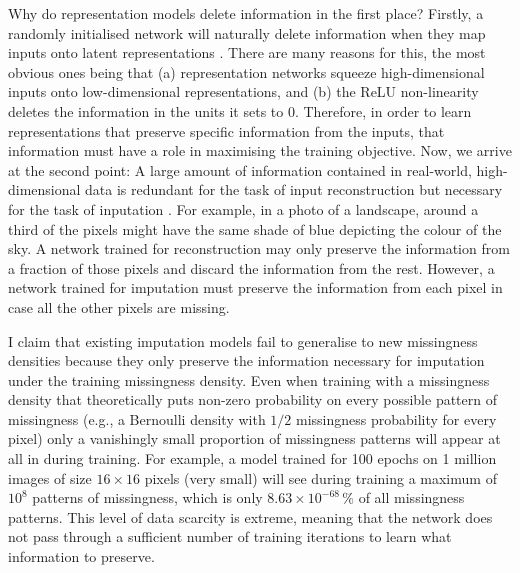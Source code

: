 \documentclass[../thesis.tex]{subfiles}
\begin{document}
Why do representation models delete information in the first place? Firstly, a randomly initialised network will naturally delete information when they map inputs onto latent representations \citep{lempitskyDeepImagePrior2018}. There are many reasons for this, the most obvious ones being that (a) representation networks squeeze high-dimensional inputs onto low-dimensional representations, and (b) the ReLU non-linearity deletes the information in the units it sets to 0. Therefore, in order to learn representations that preserve specific information from the inputs, that information must have a role in maximising the training objective. Now, we arrive at the second point: A large amount of information contained in real-world, high-dimensional data is redundant for the task of input reconstruction but necessary for the task of inputation \citep{feffermanTestingManifoldHypothesis2016}. For example, in a photo of a landscape, around a third of the pixels might have the same shade of blue depicting the colour of the sky. A network trained for reconstruction may only preserve the information from a fraction of those pixels and discard the information from the rest. However, a network trained for imputation must preserve the information from each pixel in case all the other pixels are missing.

I claim that existing imputation models fail to generalise to new missingness densities because they only preserve the information necessary for imputation under the training missingness density. Even when training with a missingness density that theoretically puts non-zero probability on every possible pattern of missingness (e.g., a Bernoulli density with $1/2$ missingness probability for every pixel) only a vanishingly small proportion of missingness patterns will appear at all in during training. For example, a model trained for 100 epochs on 1 million images of size $16 \times 16$ pixels (very small) will see during training a maximum of $10^8$ patterns of missingness, which is only $8.63 \times 10^{-68} \,\%$ of all missingness patterns. This level of data scarcity is extreme, meaning that the network does not pass through a sufficient number of training iterations to learn what information to preserve.


\end{document}
